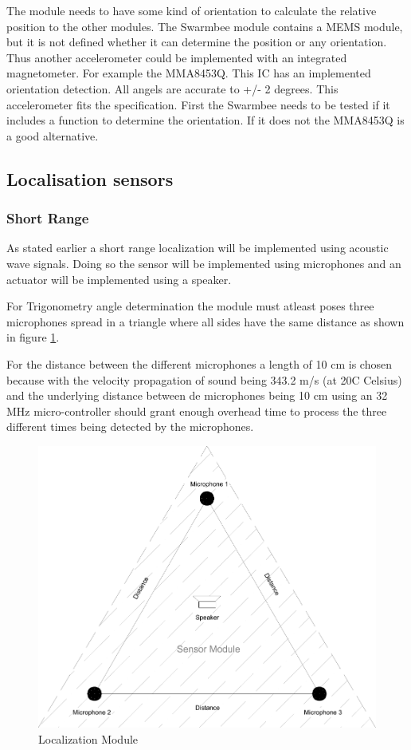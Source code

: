 \documentclass[10pt,a4paper]{article}
\begin{document}
The module needs to have some kind of orientation to calculate the relative position to the other modules. The Swarmbee module contains a MEMS module, but it is not defined whether it can determine the position or any orientation. Thus another accelerometer could be implemented with an integrated magnetometer. For example the MMA8453Q. This IC has an implemented orientation detection. All angels are accurate to +/- 2 degrees. This accelerometer fits the specification. First the Swarmbee needs to be tested if it includes a function to determine the orientation. If it does not the MMA8453Q is a good alternative. 



\subsection{Localisation sensors}


\subsubsection{Short Range}
As stated earlier a short range localization will be implemented using acoustic wave signals. Doing so the sensor will be implemented using microphones and an actuator will be implemented using a speaker. 

For Trigonometry angle determination the module must atleast poses three microphones spread in a triangle where all sides have the same distance as shown in figure \ref{module}.

For the distance between the different microphones a length of 10 cm is chosen because with the velocity propagation of sound being 343.2 m/s (at 20\degree C Celsius) and the underlying distance between de microphones being 10 cm using an 32 MHz micro-controller should grant enough overhead time to process the three different times being detected by the microphones.

\begin{figure}[H]
\centering
\includegraphics[width=1\textwidth]{Module.pdf}
\caption{Localization Module}
\label{module}
\end{figure}
\end{document}
